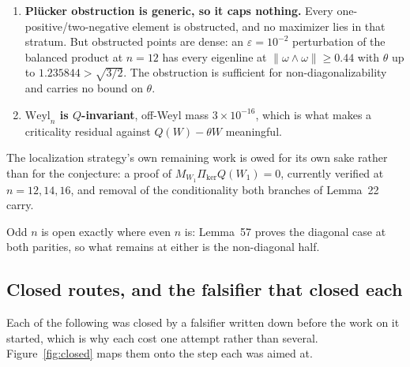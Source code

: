 \begin{enumerate}[leftmargin=1.8em]
\item \textbf{Pl\"ucker obstruction is generic, so it caps nothing.} Every one-positive/two-negative element is obstructed, and no maximizer lies in that stratum. But obstructed points are dense: an $\varepsilon=10^{-2}$ perturbation of the balanced product at $n=12$ has every eigenline at $\lVert\omega\wedge\omega\rVert\ge0.44$ with $\theta$ up to $1.235844>\sqrt{3/2}$. The obstruction is sufficient for non-diagonalizability and carries no bound on $\theta$.

\item \textbf{$\mathrm{Weyl}_n$ is $Q$-invariant}, off-Weyl mass $3\times10^{-16}$, which is what makes a criticality residual against $Q(W)-\theta W$ meaningful.

\end{enumerate}

The localization strategy's own remaining work is owed for its own sake rather than for the conjecture: a proof of $M_{W_1}\Pi_{\ker}Q(W_1)=0$, currently verified at $n=12,14,16$, and removal of the conditionality both branches of Lemma~22 carry.

Odd $n$ is open exactly where even $n$ is: Lemma~57 proves the diagonal case at both parities, so what remains at either is the non-diagonal half.

\subsection{Closed routes, and the falsifier that closed each}\label{sec:closedroutes}

Each of the following was closed by a falsifier written down before the work on it started, which is why each cost one attempt rather than several. Figure~\ref{fig:closed} maps them onto the step each was aimed at.

\clearpage

\clearpage

\clearpage

\clearpage



